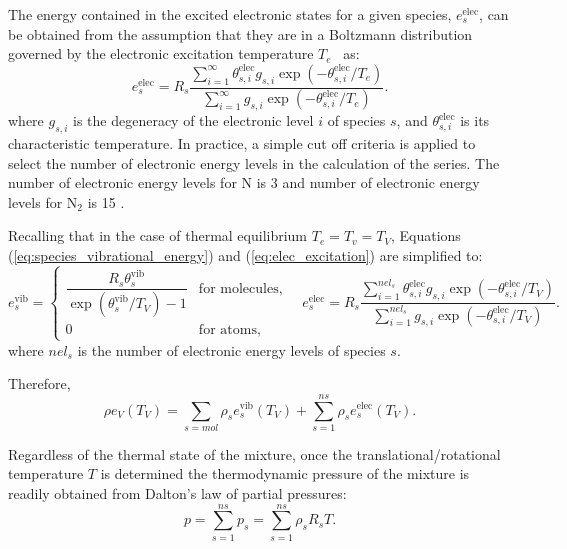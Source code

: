 \documentclass[10pt]{article}
\newcommand{\elec}{\text{elec}}
\newcommand{\vib}{\text{vib}}
\begin{document}
The energy contained in the excited electronic states for a given species, $e^{\elec}_s$, can be obtained from the assumption that they are in a Boltzmann distribution governed by the electronic excitation temperature $T_e$~\citep{candler_thesis} as:
\begin{equation}
  \label{eq:elec_excitation}
  e^{\elec}_s = R_s \dfrac{\sum_{i=1}^\infty \theta^{\elec}_{s,i} g_{s,i} \exp\left(-\theta^{\elec}_{s,i}/T_e\right)}{ \sum_{i=1}^\infty g_{s,i} \exp\left(-\theta^{\elec}_{s,i}/T_e\right)}.
\end{equation}
where $g_{s,i}$ is the degeneracy of the electronic level $i$ of species $s$, and  $\theta^{\elec}_{s,i}$ is its characteristic temperature. In practice, a simple cut off criteria is applied to select the number of electronic energy levels in the calculation of the series. The number of electronic energy levels for N is 3 and number of electronic energy levels for N$_2$ is 15 \cite{dodod}.

Recalling that  in the case of thermal equilibrium $T_e=T_v= T_V$, Equations (\ref{eq:species_vibrational_energy}) and (\ref{eq:elec_excitation}) are simplified to:
\begin{equation*}
  e^{\text{vib}}_s = 
  \begin{cases}    
    \dfrac{R_s\theta^{\vib}_{s}}{\exp\left(\theta^{\vib}_{s}/T_V\right) - 1} & \text{for molecules}, \\
    0 & \text{for atoms},
  \end{cases}
\quad
e^{\elec}_s = R_s \dfrac{\sum_{i=1}^{nel_s} \theta^{\elec}_{s,i} g_{s,i} \exp\left(-\theta^{\elec}_{s,i}/T_V\right)}{ \sum_{i=1}^{nel_s} g_{s,i} \exp\left(-\theta^{\elec}_{s,i}/T_V\right)}.
\end{equation*}
where $nel_s$ is the number of electronic energy levels of species $s$.

Therefore, 
\begin{equation}
  \label{eq:rev-Tv-relationship}
  \rho e_V\left(T_V\right) = \sum_{s=mol} \rho_s e^{\text{vib}}_s\left(T_V\right) + \sum_{s=1}^{ns} \rho_s e^{\text{elec}}_s\left(T_V\right).
\end{equation}

Regardless of the thermal state of the mixture, once the translational/rotational temperature $T$ is determined the thermodynamic pressure of the mixture is readily obtained from Dalton's law of partial pressures:
\begin{equation}
 p = \sum_{s=1}^{ns} p_s = \sum_{s=1}^{ns} \rho_s R_s T .
 \label{eq:p_eq_state}
\end{equation}
\end{document}
